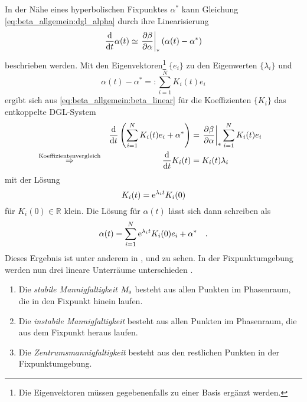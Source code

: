     In der Nähe eines hyperbolischen Fixpunktes $\alpha^*$ kann Gleichung 
    \eqref{eq:beta_allgemein:dgl_alpha} durch ihre Linearisierung
    \begin{equation}
     \frac{\text{d}}{\text{d} t} \alpha(t) \simeq \left.\frac{\partial \beta}{\partial \alpha}\right|_* \left(\alpha(t)-\alpha^*\right) 
     \label{eq:beta_allgemein:beta_linear}
    \end{equation}
     beschrieben werden. Mit den Eigenvektoren\footnote{Die Eigenvektoren 
     müssen gegebenenfalls zu einer Basis ergänzt werden.} $\{e_i\}$ zu den Eigenwerten 
     $\{\lambda_i\}$ und 
     \begin{equation}
      \alpha(t)-\alpha^*=:\sum_{i=1}^N K_i(t) e_i
     \end{equation}
     ergibt sich aus \eqref{eq:beta_allgemein:beta_linear} für die 
     Koeffizienten $\{K_i\}$ das entkoppelte DGL-System
    \begin{align}
     &&\frac{\text{d}}{\text{d} t} \left(\sum\limits_{i=1}^N K_i(t)e_i + \alpha^* \right) &=
     \left.\frac{\partial \beta}{\partial \alpha}\right|_* \sum\limits_{i=1}^N K_i(t) e_i \\
     &\overset{\text{Koeffizientenvergleich}}{\Rightarrow}
     &  \frac{\text{d}}{\text{d} t} K_i(t) &= K_i(t) \lambda_i & \label{eq:beta_allgemein:K} 
    \end{align}
    mit der Lösung
    \begin{equation}
     K_i(t)=\text{e}^{\lambda_i t} K_i(0) \label{eq:beta_allgemein:K_loesung}
    \end{equation}
    für $K_i(0) \in \mathbb{R}$ klein. Die Lösung für $\alpha(t)$ lässt sich dann schreiben als 
    \begin{equation}
     \alpha(t)=\sum\limits_{i=1}^N \text{e}^{\lambda_i t} K_i(0) e_i +\alpha^* 
     \label{eq:beta_allgemein:loesung} \quad .
    \end{equation}
    Dieses Ergebnis ist unter anderem in \cite{Weinberg:1976}, \cite{General_relativity} und 
    \cite{Asymptotic_safety_guaranteed} zu sehen.
    In der Fixpunktumgebung werden nun drei lineare Unterräume unterschieden 
    \cite{Bronstein4}.
    \begin{enumerate}
      \item Die \textit{stabile Mannigfaltigkeit} $M_\text{s}$ besteht aus allen Punkten im Phasenraum, 
      die in den Fixpunkt hinein laufen.
      \item Die \textit{instabile Mannigfaltigkeit} besteht aus allen Punkten im Phasenraum, 
      die aus dem Fixpunkt heraus laufen.
      \item Die \textit{Zentrumsmannigfaltigkeit} besteht aus den restlichen 
      Punkten in der Fix\-punkt\-um\-ge\-bung.
     \end{enumerate}
